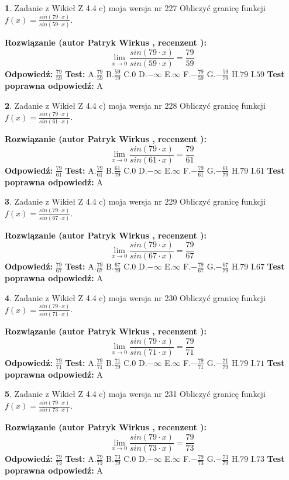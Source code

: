 \documentclass[12pt, a4paper]{article}
\theoremstyle{definition} %
\newtheorem{zad}{}
\newcommand{\zadStart}[1]{\begin{zad}#1\newline}
\newcommand{\zadStop}{\end{zad}}
\newcommand{\rozwStart}[2]{\noindent \textbf{Rozwiązanie (autor #1 , recenzent #2): }\newline}
\newcommand{\rozwStop}{\newline}
\newcommand{\odpStart}{\noindent \textbf{Odpowiedź:}\newline}
\newcommand{\odpStop}{\newline}
\newcommand{\testStart}{\noindent \textbf{Test:}\newline}
\newcommand{\testStop}{\newline}
\newcommand{\kluczStart}{\noindent \textbf{Test poprawna odpowiedź:}\newline}
\newcommand{\kluczStop}{\newline}
\begin{document}
\zadStart{Zadanie z Wikieł Z 4.4 c) moja wersja nr 227}
Obliczyć granicę funkcji $f(x)=\frac{sin(79\cdot x)}{sin(59\cdot x)}$.
\zadStop
\rozwStart{Patryk Wirkus}{}
$$\lim\limits_{x\to 0}\frac{sin(79\cdot x)}{sin(59\cdot x)}=
\frac{79}{59}$$
\rozwStop
\odpStart
$\frac{79}{59}$
\odpStop
\testStart
A.$\frac{79}{59}$
B.$\frac{59}{79}$
C.$0$
D.$-\infty$
E.$\infty$
F.$-\frac{79}{59}$
G.$-\frac{59}{79}$
H.$79$
I.$59$
\testStop
\kluczStart
A
\kluczStop



\zadStart{Zadanie z Wikieł Z 4.4 c) moja wersja nr 228}
Obliczyć granicę funkcji $f(x)=\frac{sin(79\cdot x)}{sin(61\cdot x)}$.
\zadStop
\rozwStart{Patryk Wirkus}{}
$$\lim\limits_{x\to 0}\frac{sin(79\cdot x)}{sin(61\cdot x)}=
\frac{79}{61}$$
\rozwStop
\odpStart
$\frac{79}{61}$
\odpStop
\testStart
A.$\frac{79}{61}$
B.$\frac{61}{79}$
C.$0$
D.$-\infty$
E.$\infty$
F.$-\frac{79}{61}$
G.$-\frac{61}{79}$
H.$79$
I.$61$
\testStop
\kluczStart
A
\kluczStop



\zadStart{Zadanie z Wikieł Z 4.4 c) moja wersja nr 229}
Obliczyć granicę funkcji $f(x)=\frac{sin(79\cdot x)}{sin(67\cdot x)}$.
\zadStop
\rozwStart{Patryk Wirkus}{}
$$\lim\limits_{x\to 0}\frac{sin(79\cdot x)}{sin(67\cdot x)}=
\frac{79}{67}$$
\rozwStop
\odpStart
$\frac{79}{67}$
\odpStop
\testStart
A.$\frac{79}{67}$
B.$\frac{67}{79}$
C.$0$
D.$-\infty$
E.$\infty$
F.$-\frac{79}{67}$
G.$-\frac{67}{79}$
H.$79$
I.$67$
\testStop
\kluczStart
A
\kluczStop



\zadStart{Zadanie z Wikieł Z 4.4 c) moja wersja nr 230}
Obliczyć granicę funkcji $f(x)=\frac{sin(79\cdot x)}{sin(71\cdot x)}$.
\zadStop
\rozwStart{Patryk Wirkus}{}
$$\lim\limits_{x\to 0}\frac{sin(79\cdot x)}{sin(71\cdot x)}=
\frac{79}{71}$$
\rozwStop
\odpStart
$\frac{79}{71}$
\odpStop
\testStart
A.$\frac{79}{71}$
B.$\frac{71}{79}$
C.$0$
D.$-\infty$
E.$\infty$
F.$-\frac{79}{71}$
G.$-\frac{71}{79}$
H.$79$
I.$71$
\testStop
\kluczStart
A
\kluczStop



\zadStart{Zadanie z Wikieł Z 4.4 c) moja wersja nr 231}
Obliczyć granicę funkcji $f(x)=\frac{sin(79\cdot x)}{sin(73\cdot x)}$.
\zadStop
\rozwStart{Patryk Wirkus}{}
$$\lim\limits_{x\to 0}\frac{sin(79\cdot x)}{sin(73\cdot x)}=
\frac{79}{73}$$
\rozwStop
\odpStart
$\frac{79}{73}$
\odpStop
\testStart
A.$\frac{79}{73}$
B.$\frac{73}{79}$
C.$0$
D.$-\infty$
E.$\infty$
F.$-\frac{79}{73}$
G.$-\frac{73}{79}$
H.$79$
I.$73$
\testStop
\kluczStart
A
\kluczStop
\end{document}
